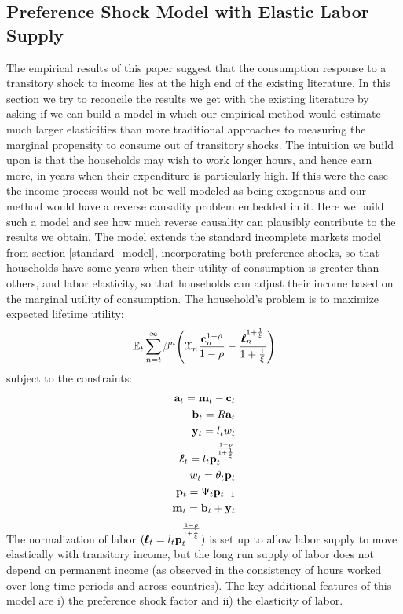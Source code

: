 \documentclass[titlepage]{\econtex}\newcommand{\texname}{IncomeUncertainty}
\begin{document}
\subsection{Preference Shock Model with Elastic Labor Supply} \label{pref_shock_model}
The empirical results of this paper suggest that the consumption response to a transitory shock to income lies at the high end of the existing literature. In this section we try to reconcile the results we get with the existing literature by asking if we can build a model in which our empirical method would estimate much larger elasticities than more traditional approaches to measuring the marginal propensity to consume out of transitory shocks. The intuition we build upon is that the households may wish to work longer hours, and hence earn more, in years when their expenditure is particularly high. If this were the case the income process would not be well modeled as being exogenous and our method would have a reverse causality problem embedded in it. Here we build such a model and see how much reverse causality can plausibly contribute to the results we obtain.
The model extends the standard incomplete markets model from section \ref{standard_model}, incorporating both preference shocks, so that households have some years when their utility of consumption is greater than others, and labor elasticity, so that households can adjust their income based on the marginal utility of consumption. The household's problem is to maximize expected lifetime utility:
\begin{align*}
\mathbb{E}_t \sum_{n=t}^{\infty} \beta^n \Bigg(\mathcal{X}_n \frac{ \mathbf{c}_n^{1-\rho}}{1-\rho}-\frac{\pmb{\ell}_n^{1+\frac{1}{\xi}}}{1+\frac{1}{\xi}} \Bigg)
\end{align*}
subject to the constraints:
\begin{align*}
\mathbf{a}_t = \mathbf{m}_t - \mathbf{c}_t \\
\mathbf{b}_t = R\mathbf{a}_t \\
\mathbf{y}_t =  l_t w_t \\
\pmb{\ell}_t = l_t \mathbf{p}_t^{\frac{1-\rho}{1+\frac{1}{\xi}}}\\
w_t = \theta_t \mathbf{p}_t \\
\mathbf{p}_t = \Psi_t \mathbf{p}_{t-1} \\
\mathbf{m}_t = \mathbf{b}_t + \mathbf{y}_t
\end{align*}
The normalization of labor $(\pmb{\ell}_t = l_t \mathbf{p}_t^{\frac{1-\rho}{1+\frac{1}{\xi}}})$ is set up to allow labor supply to move elastically with transitory income, but the long run supply of labor does not depend on permanent income (as observed in the consistency of hours worked over long time periods and across countries). The key additional features of this model are i) the preference shock factor and ii) the elasticity of labor.
\end{document}
